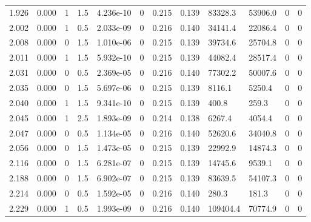 \documentclass[preview]{standalone}
\begin{document}
{{{\begin{tabular}{L{1.2cm}C{1.2cm} C{0.3cm}C{0.5cm} C{1.4cm}C{1.4cm} C{1.4cm}C{1.4cm} C{1.6cm}C{1.6cm} C{1.6cm}C{1.6cm}}
  1.926  &  0.000  & 1     & 1.5 &  4.236e-10  & 0  &  0.215&   0.139& 83328.3 & 53906.0   &  0 & 0  \\ 
  2.002  &  0.000  & 1     & 0.5 &  2.033e-09  & 0  &  0.216&   0.140& 34141.4 & 22086.4   &  0 & 0  \\ 
  2.008  &  0.000  & 0     & 1.5 &  1.010e-06  & 0  &  0.215&   0.139& 39734.6 & 25704.8   &  0 & 0  \\ 
  2.011  &  0.000  & 1     & 1.5 &  5.932e-10  & 0  &  0.215&   0.139& 44082.4 & 28517.4   &  0 & 0  \\ 
  2.031  &  0.000  & 0     & 0.5 &  2.369e-05  & 0  &  0.216&   0.140& 77302.2 & 50007.6   &  0 & 0  \\ 
  2.035  &  0.000  & 0     & 1.5 &  5.697e-06  & 0  &  0.215&   0.139& 8116.1 & 5250.4   &  0 & 0  \\ 
  2.040  &  0.000  & 1     & 1.5 &  9.341e-10  & 0  &  0.215&   0.139& 400.8 & 259.3   &  0 & 0  \\ 
  2.045  &  0.000  & 1     & 2.5 &  1.893e-09  & 0  &  0.214&   0.138& 6267.4 & 4054.4   &  0 & 0  \\ 
  2.047  &  0.000  & 0     & 0.5 &  1.134e-05  & 0  &  0.216&   0.140& 52620.6 & 34040.8   &  0 & 0  \\ 
  2.056  &  0.000  & 0     & 1.5 &  1.473e-05  & 0  &  0.215&   0.139& 22992.9 & 14874.3   &  0 & 0  \\ 
  2.116  &  0.000  & 0     & 1.5 &  6.281e-07  & 0  &  0.215&   0.139& 14745.6 & 9539.1   &  0 & 0  \\ 
  2.188  &  0.000  & 0     & 1.5 &  6.902e-07  & 0  &  0.215&   0.139& 83639.5 & 54107.3   &  0 & 0  \\ 
  2.214  &  0.000  & 0     & 0.5 &  1.592e-05  & 0  &  0.216&   0.140& 280.3 & 181.3   &  0 & 0  \\ 
  2.229  &  0.000  & 1     & 0.5 &  1.993e-09  & 0  &  0.216&   0.140& 109404.4 & 70774.9   &  0 & 0  \\ 
\hline 
\end{tabular} 

}}}
\end{document}
